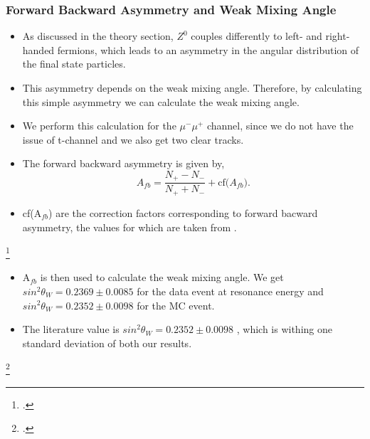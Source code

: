 \documentclass[10pt]{beamer}
\begin{document}
\begin{frame}
\frametitle{Forward Backward Asymmetry and Weak Mixing Angle}
\begin{itemize}
  \item As discussed in the theory section, $Z^0$ couples differently to left- and right-handed fermions, which leads to an asymmetry in the angular distribution of the final state particles.
  \item This asymmetry depends on the weak mixing angle. Therefore, by calculating this simple asymmetry we can calculate the weak mixing angle.
  \item We perform this calculation for the $\mu^-\mu^+$ channel, since we do not have the issue of t-channel and we also get two clear tracks.
  \item The forward backward asymmetry is given by,
  \begin{equation}
    A_{fb} = \frac{N_+ - N_-}{N_+ + N_-} + \text{cf($A_{fb}$)}.
  \end{equation}
  \item cf(A$_{fb}$) are the correction factors corresponding to forward bacward asymmetry, the values for which are taken from \footnotemark{}.
\end{itemize}
\footcitetext{UB}
\end{frame}

\begin{frame}
\begin{itemize}
  \item A$_{fb}$ is then used to calculate the weak mixing angle. We get $sin^2\theta_W = 0.2369 \pm 0.0085$ for the data event at resonance energy and $sin^2\theta_W = 0.2352 \pm 0.0098$ for the MC event.
  \item The literature value is $sin^2\theta_W = 0.2352 \pm 0.0098$ \footnotemark{}, which is withing one standard deviation of both our results.
\end{itemize}
\footcitetext{pdg2}
\end{frame}
\end{document}
